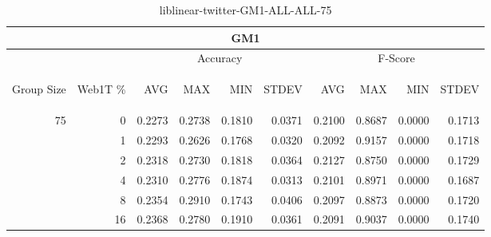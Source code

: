\begin{center}
\begin{table}[htbp] 
 \begin{center}
\begin{tabular}{ | r | r | r | r | r | r | r | r | r | r |}
\hline
\multicolumn{10}{|c|}{GM1}\\
\hline
 & & \multicolumn{4}{|c|}{Accuracy} & \multicolumn{4}{|c|}{F-Score}\\ \cline{3-10}
\begin{sideways}Group Size\end{sideways} & \begin{sideways}Web1T \%\end{sideways} & \begin{sideways}AVG\end{sideways} & \begin{sideways}MAX\end{sideways} & \begin{sideways}MIN\end{sideways} & \begin{sideways}STDEV\end{sideways} & \begin{sideways}AVG\end{sideways} & \begin{sideways}MAX\end{sideways} & \begin{sideways}MIN\end{sideways} & \begin{sideways}STDEV\end{sideways}\\
\hline
\multirow{5}{*}{75}
 & 0 & 0.2273 & 0.2738 & 0.1810 & 0.0371 & 0.2100 & 0.8687 & 0.0000 & 0.1713\\ \cline{2-10}
 & 1 & 0.2293 & 0.2626 & 0.1768 & 0.0320 & 0.2092 & 0.9157 & 0.0000 & 0.1718\\ \cline{2-10}
 & 2 & 0.2318 & 0.2730 & 0.1818 & 0.0364 & 0.2127 & 0.8750 & 0.0000 & 0.1729\\ \cline{2-10}
 & 4 & 0.2310 & 0.2776 & 0.1874 & 0.0313 & 0.2101 & 0.8971 & 0.0000 & 0.1687\\ \cline{2-10}
 & 8 & 0.2354 & 0.2910 & 0.1743 & 0.0406 & 0.2097 & 0.8873 & 0.0000 & 0.1720\\ \cline{2-10}
 & 16 & 0.2368 & 0.2780 & 0.1910 & 0.0361 & 0.2091 & 0.9037 & 0.0000 & 0.1740\\ \cline{2-10}
\hline
\end{tabular}
\caption{liblinear-twitter-GM1-ALL-ALL-75}
\label{table:liblinear-twitter-GM1-ALL-ALL-75}
\end{center}
 \end{table}
\end{center}

